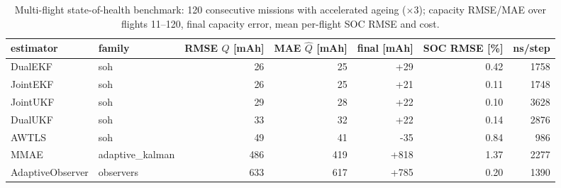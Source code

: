 \begin{table}[H]\centering\footnotesize\setlength{\tabcolsep}{3.5pt}\caption{Multi-flight state-of-health benchmark: 120 consecutive missions with accelerated ageing ($\times$3); capacity RMSE/MAE over flights 11--120, final capacity error, mean per-flight SOC RMSE and cost.}\label{tab:soh_overview}
\begin{tabular}{llrrrrr}\toprule estimator & family & RMSE $\hat Q$ [mAh] & MAE $\hat Q$ [mAh] & final [mAh] & SOC RMSE [\%] & ns/step \\ \midrule
DualEKF & soh & 26 & 25 & +29 & 0.42 & 1758 \\
JointEKF & soh & 26 & 25 & +21 & 0.11 & 1748 \\
JointUKF & soh & 29 & 28 & +22 & 0.10 & 3628 \\
DualUKF & soh & 33 & 32 & +22 & 0.14 & 2876 \\
AWTLS & soh & 49 & 41 & -35 & 0.84 & 986 \\
MMAE & adaptive\_kalman & 486 & 419 & +818 & 1.37 & 2277 \\
AdaptiveObserver & observers & 633 & 617 & +785 & 0.20 & 1390 \\
\bottomrule\end{tabular}\end{table}
